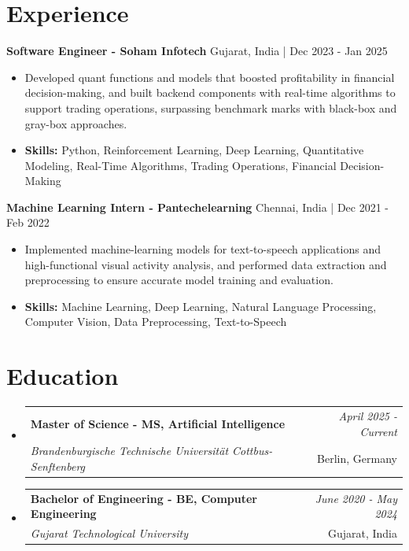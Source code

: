 \documentclass[a4paper,11pt]{article}
\makeatletter
\newcommand{\resumeSubheading}[4]{
\vspace{0.5mm}\item
    \begin{tabular*}{\linewidth}[t]{l@{\extracolsep{\fill}}r}
        \textbf{#1} & \textit{\footnotesize{#4}} \\
        \textit{\footnotesize{#3}} &  \footnotesize{#2}\\
    \end{tabular*}
    \vspace{-2.4mm}
}
\makeatother
\begin{document}
\section{\textbf{Experience}}


\vspace{1mm}
  \textbf{Software Engineer - Soham Infotech} \hfill Gujarat, India | Dec 2023 - Jan 2025
\vspace{-1.5mm} %
\begin{itemize}
  \item Developed quant functions and models that boosted profitability in financial decision-making, and built backend components with real-time algorithms to support trading operations, surpassing benchmark marks with black-box and gray-box approaches.

\vspace{-2mm}
  \item \textbf{Skills:} Python, Reinforcement Learning, Deep Learning, Quantitative Modeling, Real-Time Algorithms, Trading Operations, Financial Decision-Making
\end{itemize}

\vspace{1mm}
  \textbf{Machine Learning Intern - Pantechelearning} \hfill Chennai, India | Dec 2021 - Feb 2022
\vspace{-1.5mm} %
\begin{itemize}
  \item Implemented machine-learning models for text-to-speech applications and high-functional visual activity analysis, and performed data extraction and preprocessing to ensure accurate model training and evaluation.
\vspace{-2mm}
  \item \textbf{Skills:} Machine Learning, Deep Learning, Natural Language Processing, Computer Vision, Data Preprocessing, Text-to-Speech
\end{itemize}\section{\textbf{Education}}
\vspace{-0.4mm}

\begin{itemize}[leftmargin=0.15in, label={}]
\resumeSubheading
{Master of Science - MS, Artificial Intelligence }{Berlin, Germany}
{Brandenburgische Technische Universität Cottbus-Senftenberg  }{April 2025 - Current}

\vspace{1.0mm} %
\resumeSubheading
{Bachelor of Engineering - BE, Computer Engineering  }{Gujarat, India}
{Gujarat Technological University }{June 2020 - May 2024}

\end{itemize}
\end{document}

